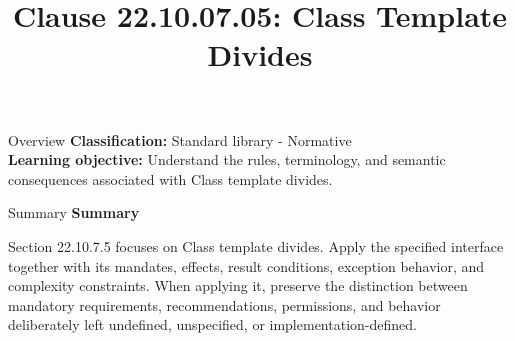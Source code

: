\documentclass[10pt,letterpaper]{article}
\title{Clause 22.10.07.05: Class Template Divides}
\author{}
\date{}
\begin{document}
\maketitle
\begin{CornellOverviewBox}{Overview}
\textbf{Classification:} Standard library - Normative\\[2pt]
\textbf{Learning objective:} Understand the rules, terminology, and semantic consequences associated with Class template divides.
\end{CornellOverviewBox}\begin{CornellSummaryBox}{Summary}
{\sffamily\bfseries\color{Accent} Summary}\par\vspace{3pt}Section 22.10.7.5 focuses on Class template divides. Apply the specified interface together with its mandates, effects, result conditions, exception behavior, and complexity constraints. When applying it, preserve the distinction between mandatory requirements, recommendations, permissions, and behavior deliberately left undefined, unspecified, or implementation-defined.
\end{CornellSummaryBox}
\end{document}
